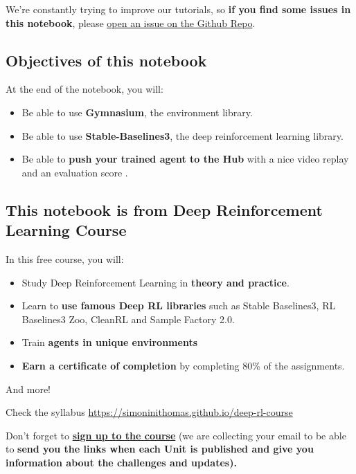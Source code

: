 \documentclass[11pt,a4paper]{article}
\begin{document}
We're constantly trying to improve our tutorials, so \textbf{if you find some issues in this notebook}, please \href{https://github.com/huggingface/deep-rl-class/issues}{open an issue on the Github Repo}.

\subsection{Objectives of this notebook}\label{objectives-of-this-notebook}

At the end of the notebook, you will:

\begin{itemize}
\tightlist
\item
  Be able to use \textbf{Gymnasium}, the environment library.
\item
  Be able to use \textbf{Stable-Baselines3}, the deep reinforcement learning library.
\item
  Be able to \textbf{push your trained agent to the Hub} with a nice video replay and an evaluation score .
\end{itemize}

\subsection{This notebook is from Deep Reinforcement Learning Course}\label{this-notebook-is-from-deep-reinforcement-learning-course}


In this free course, you will:

\begin{itemize}
\tightlist
\item
  Study Deep Reinforcement Learning in \textbf{theory and practice}.
\item
  Learn to \textbf{use famous Deep RL libraries} such as Stable Baselines3, RL Baselines3 Zoo, CleanRL and Sample Factory 2.0.
\item
  Train \textbf{agents in unique environments}
\item
  \textbf{Earn a certificate of completion} by completing 80\% of the assignments.
\end{itemize}

And more!

Check the syllabus \url{https://simoninithomas.github.io/deep-rl-course}

Don't forget to \textbf{\href{http://eepurl.com/ic5ZUD}{sign up to the course}} (we are collecting your email to be able to \textbf{send you the links when each Unit is published and give you information about the challenges and updates).}
\end{document}

